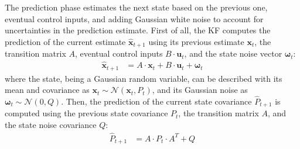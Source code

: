 The prediction phase estimates the next state based on the previous one, eventual control inputs, and adding Gaussian white noise to account for uncertainties in the prediction estimate.
First of all, the \gls{KF} computes the prediction of the current estimate $\hat{\mathbf{x}}_{t+1}$ using its previous estimate $\mathbf{x}_t $, the transition matrix $A$, eventual control inputs $B \cdot \mathbf{u}_t$, and the state noise vector $\boldsymbol \omega_t$:
\begin{align}
\hat{\mathbf{x}}_{t+1} & = A \cdot \mathbf{x}_t + B \cdot \mathbf{u}_t + \boldsymbol \omega_t
  \label{eq:pred-state}
\end{align}
where the state, being a Gaussian random variable, can be described with its mean and covariance as $\mathbf{x}_{t} \sim \mathcal{N}\left(\mathbf{x}_{t},P_{t}\right)$, and its Gaussian noise as $\boldsymbol \omega_t \sim \mathcal{N}\left(0, Q\right)$.
Then, the prediction of the current state covariance $\hat{P}_{t+1}$ is computed using the previous state covariance $P_t$, the transition matrix $A$, and the state noise covariance $Q$: 
    \begin{align}
        \hat{P}_{t+1} & = A \cdot P_t \cdot A^T + Q 
    \end{align} 


